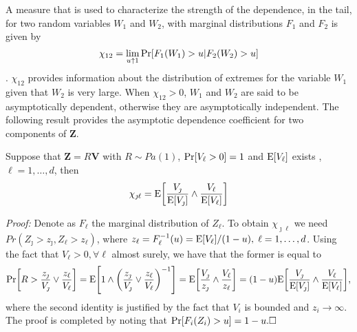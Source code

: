 A measure that is used to characterize the strength of the dependence,
in the tail, for two random variables $W_1$ and $W_2$, with marginal
distributions $F_1$ and $F_2$ is given by
\[	\chi_{12} = \lim_{u\uparrow 1} \prob{F_1(W_1)>u|F_2(W_2)>u}  \]
\citep{coles2001}.
$\chi_{12}$ provides information about the distribution of extremes for the variable $W_1$
given that $W_2$ is very large.  When $\chi_{12}>0$, $W_1$ and $W_2$ 
are said to
be asymptotically dependent, otherwise they are asymptotically
independent. The following result provides the asymptotic dependence coefficient for two components of $\bm{Z}$. 
\begin{prop}\label{ppchi}
Suppose that $\bm{Z} = R\bm{V}$ with $R\sim Pa(1)$,
$\prob{V_\ell > 0} = 1$ and $\expect{V_\ell}$ exists ,
$\ell=1, \ldots ,d$, then
\begin{equation}
    \label{eqn:chi_ij}
	\chi_{\jmath\ell} = \expect{\frac{V_\jmath}{\expect{V_\jmath}} \wedge \frac{V_\ell}{\expect{V_\ell}}}
\end{equation}
\end{prop}
{\em Proof:}
Denote as $F_\ell$ the marginal distribution of $Z_\ell$. To obtain $\chi_{\jmath\ell}$ we need $Pr(Z_\jmath>z_\jmath,Z_\ell>z_\ell)$, where $z_\ell =
F_\ell^{-1}(u) = \expect{V_\ell}/(1 - u), \;\ell=1,\dots, d$.
Using the fact that
$V_\ell>0, \forall \ell$ almost surely, we have that the former is equal to
\begin{equation*}
\prob{R>\frac{z_\jmath}{V_\jmath}\vee\frac{z_\ell}{V_\ell}}
    = \expect{1\wedge\left(\frac{z_\jmath}{V_\jmath}\vee\frac{z_\ell}{V_\ell}\right)^{-1}}
    = \expect{\frac{V_\jmath}{z_\jmath}\wedge\frac{V_\ell}{z_\ell}}
    = (1 - u)\expect{\frac{V_\jmath}{\expect{V_\jmath}}\wedge\frac{V_\ell}{\expect{V_\ell}}},
\end{equation*}
where the second identity is justified by the fact that $V_i$ is
bounded and $z_i\rightarrow\infty$. The proof is completed by noting
that $\prob{F_i(Z_i)>u} = 1 - u.\hfill\Box$

